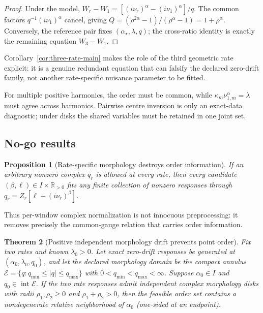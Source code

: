 \documentclass[11pt]{article}
\newtheorem{theorem}{Theorem}[section]
\newtheorem{proposition}[theorem]{Proposition}
\theoremstyle{definition}
\theoremstyle{remark}
\newcommand{\R}{\mathbb R}
\begin{document}
\begin{proof}
Under the model,
$W_r-W_1=[(i\nu_r)^\alpha-(i\nu_1)^\alpha]/q$.  The common factors
$q^{-1}(i\nu_1)^\alpha$ cancel, giving
$Q=(\rho^{2\alpha}-1)/(\rho^\alpha-1)=1+\rho^\alpha$.  Conversely, the
reference pair fixes $(\alpha_\star,\lambda,q)$; the cross-ratio identity is
exactly the remaining equation $W_3-W_1$.
\end{proof}

Corollary~\ref{cor:three-rate-main} makes the role of the third geometric
rate explicit: it is a genuine redundant equation that can falsify the
declared zero-drift family, not another rate-specific nuisance parameter to
be fitted.

For multiple positive harmonics, the order must be common, while
$\kappa_m\nu_{1,m}^\alpha=\lambda$ must agree across harmonics.  Pairwise
centre inversion is only an exact-data diagnostic; under disks the shared
variables must be retained in one joint set.

\subsection{No-go results}

\begin{proposition}[Rate-specific morphology destroys order information]
\label{prop:gauge-no-go-main}
If an arbitrary nonzero complex $q_r$ is allowed at every rate, then every
candidate $(\beta,\ell)\in I\times\R_{>0}$ fits any finite collection of
nonzero responses through
$q_r=Z_r[\ell+(i\nu_r)^\beta]$.
\end{proposition}

Thus per-window complex normalization is not innocuous preprocessing: it
removes precisely the common-gauge relation that carries order information.

\begin{theorem}[Positive independent morphology drift prevents point order]
\label{thm:drift-main}
Fix two rates and known $\lambda_0>0$.  Let exact zero-drift responses be
generated at $(\alpha_0,\lambda_0,q_0)$, and let the declared morphology
domain be the compact annulus
$\mathcal E=\{q:q_{\min}\le|q|\le q_{\max}\}$ with
$0<q_{\min}<q_{\max}<\infty$.  Suppose $\alpha_0\in I$ and
$q_0\in\operatorname{int}\mathcal E$.  If the
two rate responses admit independent complex morphology disks with radii
$\rho_1,\rho_2\ge0$ and $\rho_1+\rho_2>0$, then the feasible order set contains
a nondegenerate relative neighborhood of $\alpha_0$ (one-sided at an endpoint).
\end{theorem}
\end{document}
